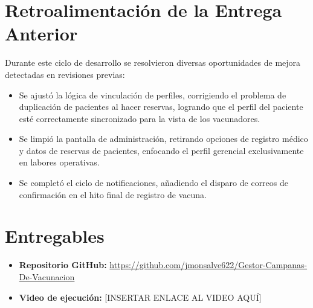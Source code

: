 \documentclass[12pt,a4paper]{article}
\begin{document}
\section{Retroalimentación de la Entrega Anterior}
Durante este ciclo de desarrollo se resolvieron diversas oportunidades de mejora detectadas en revisiones previas:
\begin{itemize}
    \item Se ajustó la lógica de vinculación de perfiles, corrigiendo el problema de duplicación de pacientes al hacer reservas, logrando que el perfil del paciente esté correctamente sincronizado para la vista de los vacunadores.
    \item Se limpió la pantalla de administración, retirando opciones de registro médico y datos de reservas de pacientes, enfocando el perfil gerencial exclusivamente en labores operativas.
    \item Se completó el ciclo de notificaciones, añadiendo el disparo de correos de confirmación en el hito final de registro de vacuna.
\end{itemize}

\section{Entregables}
\begin{itemize}
    \item \textbf{Repositorio GitHub:} \url{https://github.com/jmonsalve622/Gestor-Campanas-De-Vacunacion}
    \item \textbf{Video de ejecución:} [INSERTAR ENLACE AL VIDEO AQUÍ]
\end{itemize}
\end{document}
